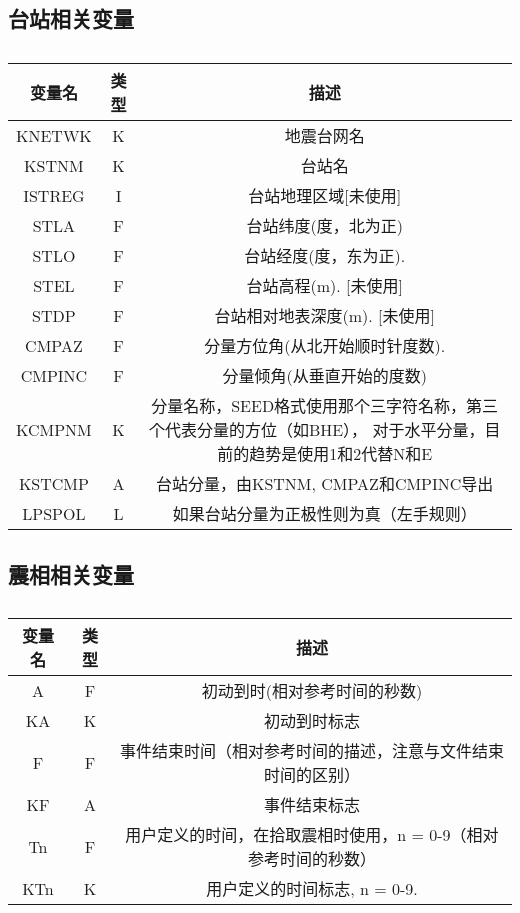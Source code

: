 \subsection{台站相关变量}
\begin{table}[H]
\centering
\caption{}
\label{}
\begin{tabular}{ccc}
    \toprule
	变量名	&	类型	&	描述\\
    \midrule
    KNETWK  &   K       &   地震台网名  \\
    KSTNM   &   K       &   台站名      \\      
    ISTREG  &   I       &   台站地理区域[未使用]    \\  
    STLA    &   F       &   台站纬度(度，北为正)    \\                           
    STLO    &   F       &   台站经度(度，东为正).   \\                           
    STEL    &   F       &   台站高程(m). [未使用]\\                              
    STDP    &   F       &   台站相对地表深度(m). [未使用]\\                      
    CMPAZ   &   F       &   分量方位角(从北开始顺时针度数).\\                    
    CMPINC  &   F       &   分量倾角(从垂直开始的度数)  \\    
    KCMPNM  &   K       &   分量名称，SEED格式使用那个三字符名称，第三个代表分量的方位（如BHE），
                            对于水平分量，目前的趋势是使用1和2代替N和E  \\ 
    KSTCMP  &   A       &   台站分量，由KSTNM, CMPAZ和CMPINC导出\\
    LPSPOL  &   L       &   如果台站分量为正极性则为真（左手规则）  \\
    \bottomrule
\end{tabular}
\end{table}

\subsection{震相相关变量}
\begin{table}[H]
\centering
\caption{}
\label{}
\begin{tabular}{ccc}
    \toprule
	变量名	&	类型	&	描述\\
    \midrule
    A       &   F       &   初动到时(相对参考时间的秒数)\\                       
    KA      &   K       &   初动到时标志    \\                                                                                                            
    F       &   F       &   事件结束时间（相对参考时间的描述，注意与文件结束时间的区别）\\
    KF      &   A       &   事件结束标志    \\                                   
    Tn      &   F       &   用户定义的时间，在拾取震相时使用，n = 0-9（相对参考时间的秒数）\\
    KTn     &   K       &   用户定义的时间标志, n = 0-9.    \\ 
    \bottomrule
\end{tabular}
\end{table}

